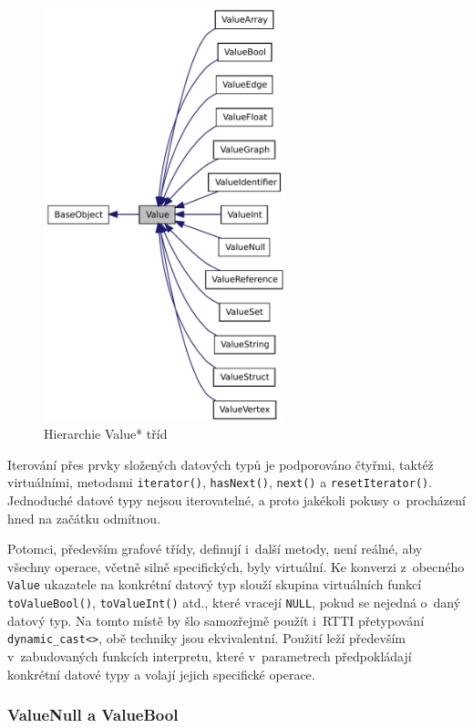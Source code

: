 \documentclass[11pt,twoside,a4paper]{book}
\begin{document}
\begin{figure}[ht]
\begin{center}
\includegraphics[height=12cm]{img/classValue__inherit__graph.pdf}
\caption{Hierarchie Value* tříd}
\label{fig:value_hierarchy}
\end{center}
\end{figure}

Iterování přes prvky složených datových typů je podporováno čtyřmi, taktéž virtuálními, metodami \texttt{iterator()}, \texttt{hasNext()}, \texttt{next()} a \texttt{resetIterator()}. Jednoduché datové typy nejsou iterovatelné, a proto jakékoli pokusy o~procházení hned na začátku odmítnou.

Potomci, především grafové třídy, definují i~další metody, není reálné, aby všechny operace, včetně silně specifických, byly virtuální. Ke konverzi z~obecného \texttt{Value} ukazatele na konkrétní datový typ slouží skupina virtuálních funkcí \texttt{toValueBool()}, \texttt{toValueInt()} atd., které vracejí \texttt{NULL}, pokud se nejedná o~daný datový typ. Na tomto místě by šlo samozřejmě použít i~RTTI přetypování \texttt{dynamic\_cast<>}, obě techniky jsou ekvivalentní. Použití leží především v~zabudovaných funkcích interpretu, které v~parametrech předpokládají konkrétní datové typy a volají jejich specifické operace.


\subsubsection{ValueNull a ValueBool}
\end{document}
